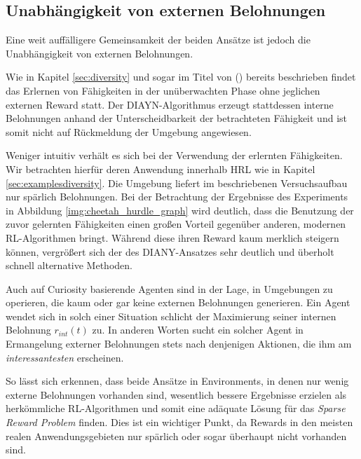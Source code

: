 \subsection{Unabhängigkeit von externen Belohnungen}
Eine weit auffälligere Gemeinsamkeit der beiden Ansätze ist jedoch die Unabhängigkeit von externen Belohnungen.

Wie in Kapitel \ref{sec:diversity} und sogar im Titel von \cite{diversity_eysenbach} () bereits beschrieben findet das Erlernen von Fähigkeiten in der unüberwachten Phase ohne jeglichen externen Reward statt. Der DIAYN-Algorithmus erzeugt stattdessen interne Belohnungen anhand der Unterscheidbarkeit der betrachteten Fähigkeit und ist somit nicht auf Rückmeldung der Umgebung angewiesen.

Weniger intuitiv verhält es sich bei der Verwendung der erlernten Fähigkeiten. Wir betrachten hierfür deren Anwendung innerhalb HRL wie in Kapitel \ref{sec:examplesdiversity}. Die Umgebung liefert im beschriebenen Versuchsaufbau nur spärlich Belohnungen. Bei der Betrachtung der Ergebnisse des Experiments in Abbildung \ref{img:cheetah_hurdle_graph} wird deutlich, dass die Benutzung der zuvor gelernten Fähigkeiten einen großen Vorteil gegenüber anderen, modernen RL-Algorithmen bringt. Während diese ihren Reward kaum merklich steigern können, vergrößert sich der des DIANY-Ansatzes sehr deutlich und überholt schnell alternative Methoden.

Auch auf Curiosity basierende Agenten sind in der Lage, in Umgebungen zu operieren, die kaum oder gar keine externen Belohnungen generieren. Ein Agent wendet sich in solch einer Situation schlicht der Maximierung seiner internen Belohnung \(r_{int}(t)\) zu. In anderen Worten sucht ein solcher Agent in Ermangelung externer Belohnungen stets nach denjenigen Aktionen, die ihm am \emph{interessantesten} erscheinen.

So lässt sich erkennen, dass beide Ansätze in Environments, in denen nur wenig externe Belohnungen vorhanden sind, wesentlich bessere Ergebnisse erzielen als herkömmliche RL-Algorithmen und somit eine adäquate Lösung für das \emph{Sparse Reward Problem} finden. Dies ist ein wichtiger Punkt, da Rewards in den meisten realen Anwendungsgebieten nur spärlich oder sogar überhaupt nicht vorhanden sind.

\bigspace

